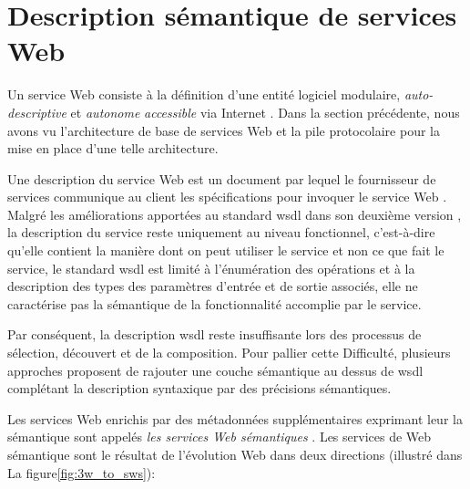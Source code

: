 
\newpage
\section{Description sémantique de services Web}
\label{sec:ws-description}

Un service Web consiste à la définition d'une entité logiciel
modulaire, \textit{auto-descriptive} et \textit{autonome}
\textit{accessible} via Internet \cite{curbera2001web}. Dans la
section précédente, nous avons vu l'architecture de base de services
Web et la pile protocolaire pour la mise en place d'une telle
architecture.



Une description du service Web est un document par lequel le
fournisseur de services communique au client les spécifications pour
invoquer le service Web \cite{lopez2008selection}. Malgré les
améliorations apportées au standard \acrshort{wsdl} dans son deuxième
version \cite{chinnici2007web}, la description du service reste
uniquement au niveau fonctionnel, c'est-à-dire qu'elle contient la
manière dont on peut utiliser le service et non ce que fait le
service, le standard \acrshort{wsdl} est limité à l'énumération des
opérations et à la description des types des paramètres d'entrée et de
sortie associés, elle ne caractérise pas la sémantique de la
fonctionnalité accomplie par le service.

Par conséquent, la description \acrshort{wsdl} reste insuffisante lors
des processus de sélection, découvert et de la composition. Pour
pallier cette Difficulté, plusieurs approches
\cite{sivashanmugam2003adding,mcilraith2001semantic,
  mcilraith2003bringing, fensel2002web} proposent de rajouter une
couche sémantique au dessus de \acrshort{wsdl} complétant la description
syntaxique par des précisions sémantiques.


Les services Web enrichis par des métadonnées supplémentaires
exprimant leur la sémantique sont appelés \textit{les services Web
sémantiques} \cite{fensel2002semantic, mcilraith2001semantic}. Les
services de Web sémantique sont le résultat de l'évolution Web dans
deux directions \cite{bartalos2011effective} (illustré dans La
figure\ref{fig:3w_to_sws}):

